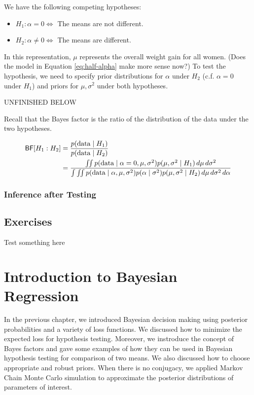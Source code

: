 \documentclass[]{book}
\providecommand{\tightlist}{%
  \setlength{\itemsep}{0pt}\setlength{\parskip}{0pt}}
\theoremstyle{definition}
\theoremstyle{definition}
\theoremstyle{definition}
\theoremstyle{remark}
\begin{document}
We have the following competing hypotheses:

\begin{itemize}
\tightlist
\item
  \(H_1: \alpha = 0 \Leftrightarrow\) The means are not different.
\item
  \(H_2: \alpha \neq 0 \Leftrightarrow\) The means are different.
\end{itemize}

In this representation, \(\mu\) represents the overall weight gain for
all women. (Does the model in Equation \eqref{eq:half-alpha} make more
sense now?) To test the hypothesis, we need to specify prior
distributions for \(\alpha\) under \(H_2\) (c.f. \(\alpha = 0\) under
\(H_1\)) and priors for \(\mu,\sigma^2\) under both hypotheses.

UNFINISHED BELOW

Recall that the Bayes factor is the ratio of the distribution of the
data under the two hypotheses.

\[\begin{aligned}
 \textsf{BF}[H_1 : H_2] &=  \frac{p(\text{data} \mid H_1)} {p(\text{data} \mid H_2)} \\
  &= \frac{\iint p(\text{data} \mid \alpha = 0,\mu,  \sigma^2 )p(\mu, \sigma^2 \mid H_1) \, d\mu \,d\sigma^2}
 {\int \iint p(\text{data} \mid \alpha, \mu, \sigma^2) p(\alpha \mid \sigma^2) p(\mu, \sigma^2 \mid H_2) \, d \mu \, d\sigma^2 \, d \alpha}
\end{aligned}\]

\subsection{Inference after Testing}\label{inference-after-testing}

\section{Exercises}\label{exercises-1}

Test something here

\chapter{Introduction to Bayesian
Regression}\label{introduction-to-bayesian-regression}

In the previous chapter, we introduced Bayesian decision making using
posterior probabilities and a variety of loss functions. We discussed
how to minimize the expected loss for hypothesis testing. Moreover, we
instroduce the concept of Bayes factors and gave some examples of how
they can be used in Bayesian hypothesis testing for comparison of two
means. We also discussed how to choose appropriate and robust priors.
When there is no conjugacy, we applied Markov Chain Monte Carlo
simulation to approximate the posterior distributions of parameters of
interest.
\end{document}

